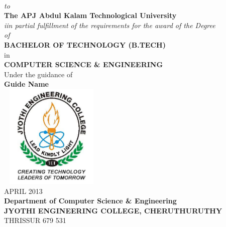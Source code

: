 \begin{titlepage}
	\textbf{\fontsize{16}{32}\selectfont{Student Name 1}} 
	\textbf{\fontsize{12}{28}\selectfont{Register No  }}
	\vspace{0.4cm}\\
	\textit{\fontsize{12}{28}\selectfont to}\\
	\vspace{0.4cm}
	\textbf{\fontsize{14}{28}\selectfont The APJ Abdul Kalam Technological University}\\
	\textit{\fontsize{14}{28}\selectfont iin partial fulfillment of the requirements for the award of the Degree\\of}\\
	\vspace{0.4cm}
	\textbf{\fontsize{16}{32}\selectfont BACHELOR OF TECHNOLOGY (B.TECH)}\\
	\vspace{0.4cm}
	in\\
	\vspace{0.4cm}
	\textbf{\fontsize{14}{28}\selectfont COMPUTER SCIENCE \& ENGINEERING}\\
	\vspace{0.4cm}
	Under the guidance of\\
	\vspace{0.4cm}
	\textbf{Guide Name}\\
	\vspace{0.4cm}
	\includegraphics[height=5cm, width=5cm]{fig/logo1.jpg}\\[0.5cm]
	\vspace{0.4cm}
	{\fontsize{14}{28}\selectfont APRIL 2013}\\[0.5cm]
	\vspace{0.4cm}
	\textbf{\fontsize{14}{28}\selectfont  Department of Computer Science \& Engineering}\\[0.1cm]
		\vspace{0.4cm}
	\textbf{\fontsize{16}{32}\selectfont JYOTHI ENGINEERING COLLEGE, CHERUTHURUTHY}\\[0.1cm]
		\vspace{0.4cm}
	THRISSUR  679 531
\end{titlepage}
\pagebreak